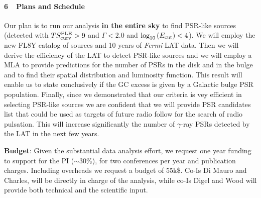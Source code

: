 \documentclass[12pt,twoside,letterpaper,onecolumn,english]{article}
\begin{document}
\paragraph{6\ \ Plans and Schedule}
Our plan is to run our analysis {\bf in the entire sky} to find PSR-like sources (detected with $TS^{\rm{PLE}}_{\rm{curv}}>9$ and $\Gamma<2.0$ and $\log_{10}{(E_{\rm{cut}})}<4$).
We will employ the new FL8Y catalog of sources and 10 years of {\it Fermi}-LAT data.
Then we will derive the efficiency of the LAT to detect PSR-like sources and we will employ a MLA to provide predictions for the number of PSRs in the disk and in the bulge and to find their spatial distribution and luminosity function.
This result will enable us to state conclusively if the GC excess is given by a Galactic bulge PSR population.
Finally, since we demonstrated that our criteria is vey efficient in selecting PSR-like sources we are confident that we will provide PSR candidates list that could be used as targets of future radio follow for the search of radio pulsation. This will increase significantly the number of $\gamma$-ray PSRs detected by the LAT in the next few years.


{\bf Budget}: Given the substantial data analysis effort, we request one year funding to support for the PI ($\sim 30\%$), for two conferences per year and publication charges. Including overheads we request a budget of 55k\$. Co-Is Di Mauro and Charles, will be directly in charge of the analysis, while co-Is Digel and Wood will provide both technical and the scientific input.



{\footnotesize
\begin{multicols}{2}


\end{multicols}
}
\end{document}
